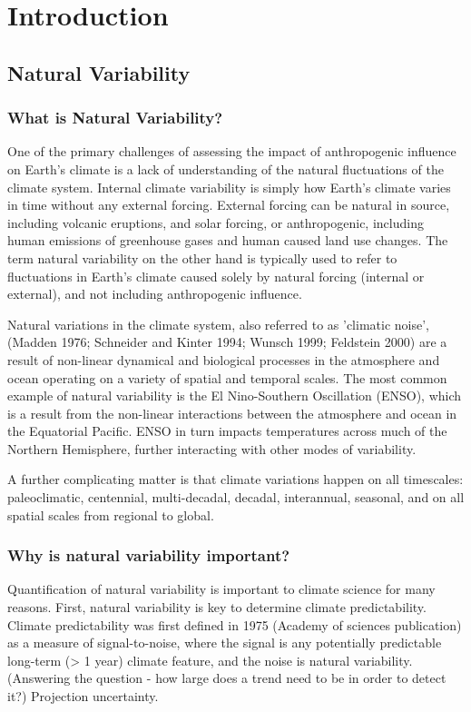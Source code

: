 \chapter{Introduction}
\label{cha:intro}

\section{Natural Variability}

\subsection{What is Natural Variability?}
One of the primary challenges of assessing the impact of anthropogenic influence on Earth's climate is a lack of understanding of the natural fluctuations of the climate system. Internal climate variability is simply how Earth's climate varies in time without any external forcing. External forcing can be natural in source, including volcanic eruptions, and solar forcing, or anthropogenic, including human emissions of greenhouse gases and human caused land use changes. The term natural variability on the other hand is typically used to refer to fluctuations in Earth's climate caused solely by natural forcing (internal or external), and not including anthropogenic influence.

Natural variations in the climate system, also referred to as 'climatic noise', (Madden 1976; Schneider and Kinter 1994; Wunsch 1999; Feldstein 2000) are a result of non-linear dynamical and biological processes in the atmosphere and ocean operating on a variety of spatial and temporal scales. The most common example of natural variability is the El Nino-Southern Oscillation (ENSO), which is a result from the non-linear interactions between the atmosphere and ocean in the Equatorial Pacific. ENSO in turn impacts temperatures across much of the Northern Hemisphere, further interacting with other modes of variability.

A further complicating matter is that climate variations happen on all timescales: paleoclimatic, centennial, multi-decadal, decadal, interannual, seasonal, and on all spatial scales from regional to global.


\subsection{Why is natural variability important? }

Quantification of natural variability is important to climate science for many reasons. First, natural variability is key to determine climate predictability. Climate predictability was first defined in 1975 (Academy of sciences publication) as a measure of signal-to-noise, where the signal is any potentially predictable long-term (> 1 year) climate feature, and the noise is natural variability. (Answering the question - how large does a trend need to be in order to detect it?)
Projection uncertainty.

